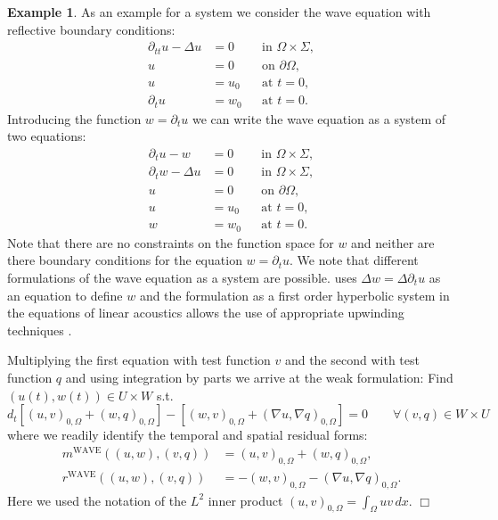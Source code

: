 \documentclass[a4paper,12pt]{article}
\theoremstyle{definition}
\newtheorem{exm}{Example}
\begin{document}
\begin{exm} \label{Exm:WaveEquation}
As an example for a system we consider the wave equation with reflective boundary conditions:
\begin{align*}
\partial_{tt} u-\Delta u  &= 0 &&\text{in $\Omega\times\Sigma$},\\
u &= 0 &&\text{on $\partial\Omega$},\\
u &= u_0 &&\text{at $t=0$},\\
\partial_t u &= w_0 &&\text{at $t=0$}.
\end{align*}
Introducing the function $w=\partial_t u$ we can write the wave equation 
as a system of two equations:
\begin{align*}
\partial_t u -w &=0 &&\text{in $\Omega\times\Sigma$},\\
\partial_t w -\Delta u &=0 &&\text{in $\Omega\times\Sigma$},\\
u &= 0 &&\text{on $\partial\Omega$},\\
u &= u_0 &&\text{at $t=0$},\\
w &= w_0 &&\text{at $t=0$}.
\end{align*}
Note that there are no constraints on the function space for $w$
and neither are there boundary conditions for the equation $w=\partial_t u$.
We note that different formulations of the wave equation as a system are
possible. \cite{Eriksson} uses $\Delta w = \Delta \partial_t u$ as 
an equation to define $w$ and the formulation as a first order hyperbolic
system in the equations of linear acoustics allows the use of appropriate
upwinding techniques \cite{LeVeque}. 

Multiplying the first equation with test function $v$ and the second with test function $q$
and using integration by parts we arrive at the weak formulation: Find $(u(t),w(t))\in
U\times W$ s.t.
\begin{equation*}
d_t \left[ (u,v)_{0,\Omega} + (w,q)_{0,\Omega}\right]
- \left[ (w,v)_{0,\Omega} + (\nabla u,\nabla q)_{0,\Omega}\right] = 0 
\qquad \forall (v,q)\in W\times U
\end{equation*}
where we readily identify the temporal and spatial residual forms:
\begin{align*}
m^{\text{WAVE}}((u,w),(v,q)) &= (u,v)_{0,\Omega} + (w,q)_{0,\Omega},\\
r^{\text{WAVE}}((u,w),(v,q)) &= -(w,v)_{0,\Omega} - (\nabla u,\nabla q)_{0,\Omega}.
\end{align*}
Here we used the notation of the $L^2$ inner product $(u,v)_{0,\Omega} = \int_\Omega
u v \, dx$.
\hfill$\Box$
\end{exm}
\end{document}
